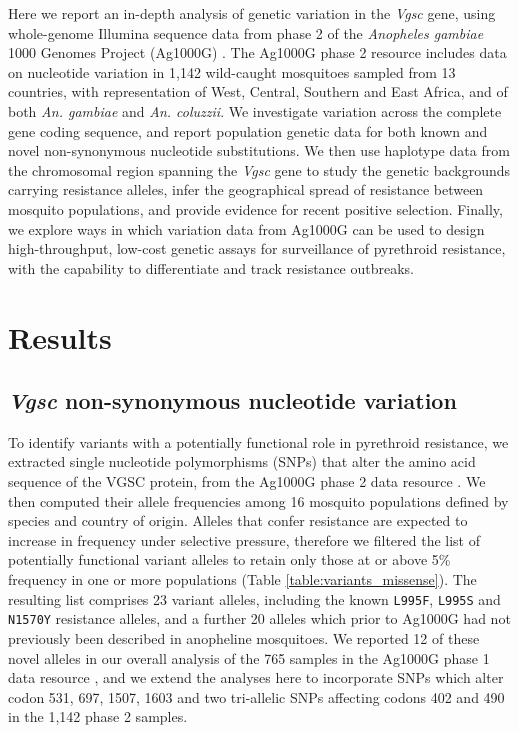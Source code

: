 \documentclass[a4paper,11pt,abstracton,hidelinks]{scrartcl}
\begin{document}
Here we report an in-depth analysis of genetic variation in the \textit{Vgsc} gene, using whole-genome Illumina sequence data from phase 2 of the \emph{Anopheles gambiae} 1000 Genomes Project (Ag1000G) \cite{clarkson2019genome}.
%
The Ag1000G phase 2 resource includes data on nucleotide variation in 1,142 wild-caught mosquitoes sampled from 13 countries, with representation of West, Central, Southern and East Africa, and of both \textit{An. gambiae} and \textit{An. coluzzii}.
%
We investigate variation across the complete gene coding sequence, and report population genetic data for both known and novel non-synonymous nucleotide substitutions.
%
We then use haplotype data from the chromosomal region spanning the \textit{Vgsc} gene to study the genetic backgrounds carrying resistance alleles, infer the geographical spread of resistance between mosquito populations, and provide evidence for recent positive selection.
%
Finally, we explore ways in which variation data from Ag1000G can be used to design high-throughput, low-cost genetic assays for surveillance of pyrethroid resistance, with the capability to differentiate and track resistance outbreaks.




\section*{Results}


\subsection*{\textit{Vgsc} non-synonymous nucleotide variation}


%
To identify variants with a potentially functional role in pyrethroid resistance, we extracted single nucleotide polymorphisms (SNPs) that alter the amino acid sequence of the VGSC protein, from the Ag1000G phase 2 data resource \cite{clarkson2019genome}.
%
We then computed their allele frequencies among 16 mosquito populations defined by species and country of origin.
%
Alleles that confer resistance are expected to increase in frequency under selective pressure, therefore we filtered the list of potentially functional variant alleles to retain only those at or above 5\% frequency in one or more populations (Table \ref{table:variants_missense}).
%
The resulting list comprises 23 variant alleles, including the known \texttt{L995F}, \texttt{L995S} and \texttt{N1570Y} resistance alleles, and a further 20 alleles which prior to Ag1000G had not previously been described in anopheline mosquitoes.
%
We reported 12 of these novel alleles in our overall analysis of the 765 samples in the Ag1000G phase 1 data resource \cite{Ag1000gConsortium2017}, and we extend the analyses here to incorporate SNPs which alter codon 531, 697, 1507, 1603 and two tri-allelic SNPs affecting codons 402 and 490 in the 1,142 phase 2 samples.
\end{document}
